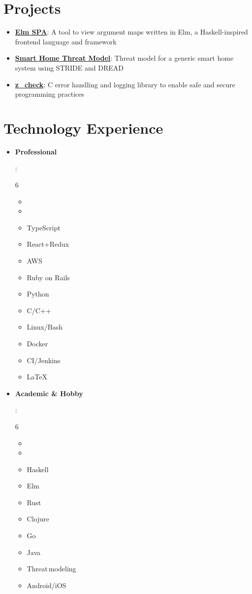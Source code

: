 \documentclass[letterpaper,11pt]{article}
\newcommand{\resumeItem}[2]{
  \item\small{
    \textbf{#1}{: #2 \vspace{-2pt}}
  }
}
\newcommand{\resumeSubItem}[2]{\resumeItem{#1}{#2}\vspace{-4pt}}
\newcommand{\resumeSubHeadingListStart}{\begin{itemize}[leftmargin=*]}
\newcommand{\resumeSubHeadingListEnd}{\end{itemize}}
\newcommand{\resumeListMulticolStart}[1]{
  \vspace{-2.4em}
  \setlength{\columnsep}{-1pc}
  \begin{multicols}{#1}
    \begin{itemize}[label={}]
      \item
}
\newcommand{\resumeListMulticolEnd}{
    \end{itemize}
  \end{multicols}
  \vspace{-10pt}
}
\begin{document}
\section{Projects}
  \resumeSubHeadingListStart
    \resumeSubItem{\href{https://kkredit.github.io/arg-viewer}{Elm SPA}}
      {A tool to view argument maps written in Elm, a Haskell-inspired frontend language and framework}
    \resumeSubItem{\href{https://github.com/kkredit/smart-home-threat-model}{Smart Home Threat Model}}
      {Threat model for a generic smart home system using STRIDE and DREAD}
    \resumeSubItem{\href{https://github.com/kkredit/z_check}{z\_check}}
      {C error handling and logging library to enable safe and secure programming practices}
  \resumeSubHeadingListEnd


\section{Technology Experience}
  \resumeSubHeadingListStart

  \resumeSubItem{Professional}
    {
      \resumeListMulticolStart{6}
        \item %
        \item TypeScript
        \item React+Redux
        \item AWS
        \item Ruby on Rails
        \item Python
        \item C/C++
        \item Linux/Bash
        \item Docker
        \item CI/Jenkins
        \item \LaTeX
      \resumeListMulticolEnd
    }
  \resumeSubItem{Academic \& Hobby}
    {
      \resumeListMulticolStart{6}
        \item %
        \item Haskell
        \item Elm
        \item Rust
        \item Clojure
        \item Go
        \item Java
        \item Threat\,modeling
        \item Android/iOS
      \resumeListMulticolEnd
    }
  \resumeSubHeadingListEnd
\end{document}
